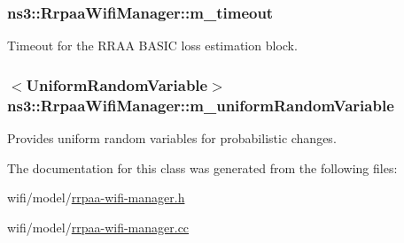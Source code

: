 \subsubsection[{\texorpdfstring{m\+\_\+timeout}{m_timeout}}]{ ns3\+::\+Rrpaa\+Wifi\+Manager\+::m\+\_\+timeout\hspace{0.3cm}{\ttfamily [private]}}\hypertarget{classns3_1_1RrpaaWifiManager_a86e264f2035d972d66a105a9c4c6d5f3}{}\label{classns3_1_1RrpaaWifiManager_a86e264f2035d972d66a105a9c4c6d5f3}


Timeout for the R\+R\+AA B\+A\+S\+IC loss estimation block. 

\subsubsection[{\texorpdfstring{m\+\_\+uniform\+Random\+Variable}{m_uniformRandomVariable}}]{$<${\bf Uniform\+Random\+Variable}$>$ ns3\+::\+Rrpaa\+Wifi\+Manager\+::m\+\_\+uniform\+Random\+Variable\hspace{0.3cm}{\ttfamily [private]}}\hypertarget{classns3_1_1RrpaaWifiManager_a04e94944516bbae00d3873065258aaad}{}\label{classns3_1_1RrpaaWifiManager_a04e94944516bbae00d3873065258aaad}


Provides uniform random variables for probabilistic changes. 



The documentation for this class was generated from the following files\+:\begin{DoxyCompactItemize}
\item 
wifi/model/\hyperlink{rrpaa-wifi-manager_8h}{rrpaa-\/wifi-\/manager.\+h}\item 
wifi/model/\hyperlink{rrpaa-wifi-manager_8cc}{rrpaa-\/wifi-\/manager.\+cc}\end{DoxyCompactItemize}
